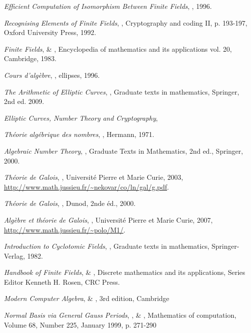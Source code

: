 \documentclass[a4paper]{article} %
\numberwithin{section}{part}
\numberwithin{equation}{section}
\begin{document}
\begin{thebibliography}{LC}

 \emph{Efficient Computation of Isomorphism Between Finite Fields},
, 1996.

 \emph{Recognising Elements of Finite Fields}, , Cryptography and coding II, p. 193-197, Oxford University Press, 1992.

 \emph{Finite Fields},  \& 
, Encyclopedia of mathematics and its applications vol.
20, Cambridge, 1983.

 \emph{Cours d'algèbre}, , ellipses, 1996.

 \emph{The Arithmetic of Elliptic Curves}, 
, Graduate texts in mathematics, Springer, 2nd ed. 
2009.

 \emph{Elliptic Curves, Number Theory and Cryptography},


 \emph{Théorie algébrique des nombres}, , 
Hermann, 1971.

 \emph{Algebraic Number Theory}, , Graduate Texts
in Mathematics, 2nd ed., Springer, 2000.

 \emph{Théorie de Galois}, , Université 
Pierre et Marie Curie, 2003,  
\url{http://www.math.jussieu.fr/~nekovar/co/ln/gal/g.pdf}.

 \emph{Théorie de Galois}, , Dunod, 2nde
éd., 2000.

 \emph{Algèbre et théorie de Galois}, , 
Université Pierre et Marie Curie, 2007,  
\url{http://www.math.jussieu.fr/~polo/M1/}.

 \emph{Introduction to Cyclotomic Fields}, , Graduate texts in mathematics, Springer-Verlag, 1982.


 \emph{Handbook of Finite Fields},  \& 
, Discrete mathematics and its applications, Series Editor 
Kenneth H. Rosen, CRC Press.

 \emph{Modern Computer Algebra},  \&
, 3rd edition, Cambridge

 \emph{Normal Basis \textup{via} General Gauss Periods},
,  \& , 
Mathematics of computation, Volume 68, Number 225, January 1999, p. 271-290


\end{thebibliography}
\end{document}
